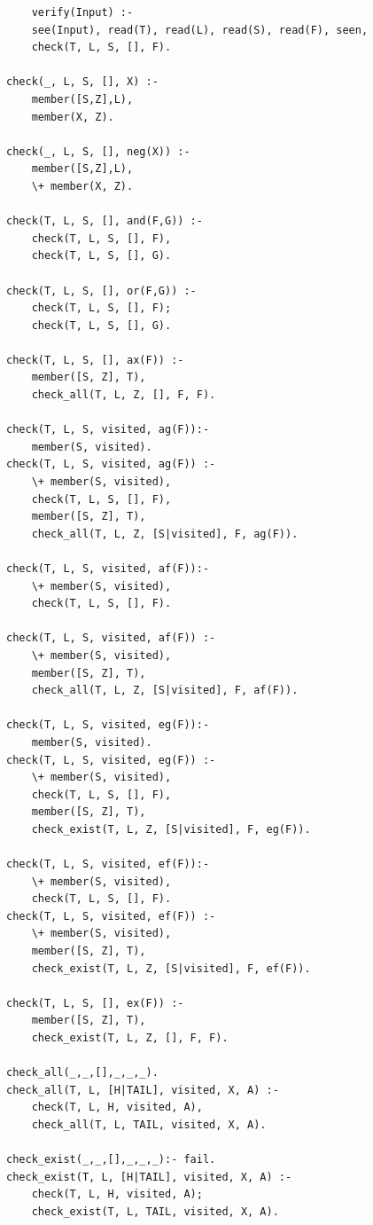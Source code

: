 \documentclass[]{article}
\begin{document}
\begin{verbatim}
	verify(Input) :-
	see(Input), read(T), read(L), read(S), read(F), seen,
	check(T, L, S, [], F).

check(_, L, S, [], X) :-
	member([S,Z],L), 
	member(X, Z).

check(_, L, S, [], neg(X)) :-
	member([S,Z],L), 
	\+ member(X, Z).

check(T, L, S, [], and(F,G)) :-
	check(T, L, S, [], F),
	check(T, L, S, [], G).

check(T, L, S, [], or(F,G)) :- 
	check(T, L, S, [], F);
	check(T, L, S, [], G).

check(T, L, S, [], ax(F)) :-
	member([S, Z], T), 
	check_all(T, L, Z, [], F, F). 

check(T, L, S, visited, ag(F)):-
	member(S, visited).
check(T, L, S, visited, ag(F)) :-
	\+ member(S, visited),
	check(T, L, S, [], F), 
	member([S, Z], T), 
	check_all(T, L, Z, [S|visited], F, ag(F)). 

check(T, L, S, visited, af(F)):-
	\+ member(S, visited),
	check(T, L, S, [], F).

check(T, L, S, visited, af(F)) :- 
	\+ member(S, visited),
	member([S, Z], T), 
	check_all(T, L, Z, [S|visited], F, af(F)). 

check(T, L, S, visited, eg(F)):-
	member(S, visited).
check(T, L, S, visited, eg(F)) :-
	\+ member(S, visited),
	check(T, L, S, [], F),
	member([S, Z], T), 
	check_exist(T, L, Z, [S|visited], F, eg(F)). 

check(T, L, S, visited, ef(F)):-
	\+ member(S, visited),
	check(T, L, S, [], F). 
check(T, L, S, visited, ef(F)) :-
	\+ member(S, visited),
	member([S, Z], T), 
	check_exist(T, L, Z, [S|visited], F, ef(F)).

check(T, L, S, [], ex(F)) :-
	member([S, Z], T), 
	check_exist(T, L, Z, [], F, F).

check_all(_,_,[],_,_,_). 
check_all(T, L, [H|TAIL], visited, X, A) :-
	check(T, L, H, visited, A), 
	check_all(T, L, TAIL, visited, X, A). 

check_exist(_,_,[],_,_,_):- fail.
check_exist(T, L, [H|TAIL], visited, X, A) :-
	check(T, L, H, visited, A); 
	check_exist(T, L, TAIL, visited, X, A). 
	
\end{verbatim}
\end{document}
